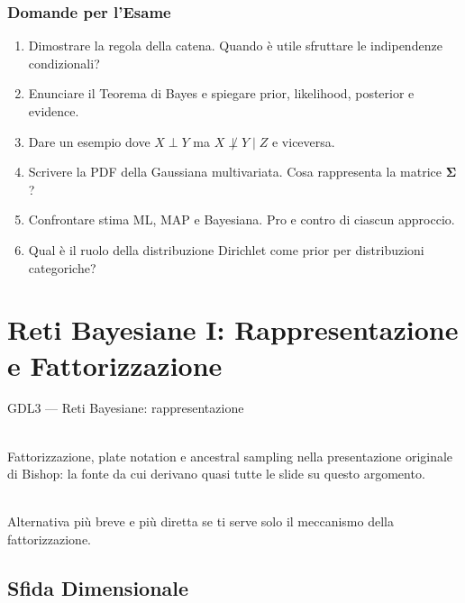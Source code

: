\subsection{Domande per l'Esame}
\begin{enumerate}
    \item Dimostrare la regola della catena. Quando è utile sfruttare le indipendenze condizionali?
    \item Enunciare il Teorema di Bayes e spiegare prior, likelihood, posterior e evidence.
    \item Dare un esempio dove $X \perp Y$ ma $X \not\perp Y \mid Z$ e viceversa.
    \item Scrivere la PDF della Gaussiana multivariata. Cosa rappresenta la matrice $\boldsymbol{\Sigma}$?
    \item Confrontare stima ML, MAP e Bayesiana. Pro e contro di ciascun approccio.
    \item Qual è il ruolo della distribuzione Dirichlet come prior per distribuzioni categoriche?
\end{enumerate}

\chapter{Reti Bayesiane I: Rappresentazione e Fattorizzazione}

\begin{risorsevideo}{GDL3 — Reti Bayesiane: rappresentazione}

\medskip
{}\\
Fattorizzazione, plate notation e ancestral sampling nella presentazione originale di Bishop: la fonte da cui derivano quasi tutte le slide su questo argomento.

\medskip
{}\\
Alternativa più breve e più diretta se ti serve solo il meccanismo della fattorizzazione.
\end{risorsevideo}

\section{Sfida Dimensionale}

